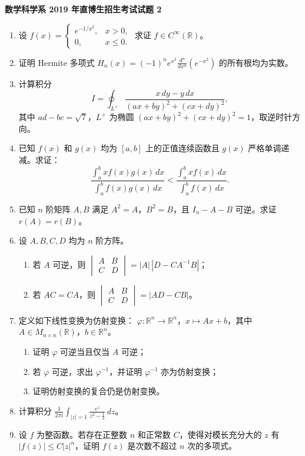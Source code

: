 \documentclass[UTF8,11pt,fontset=none]{ctexart}
\newcommand{\paperheading}[1]{\begin{center}\Large\bfseries #1\end{center}\vspace{.45em}}
\newcommand{\newpaper}[1]{\clearpage\paperheading{#1}}
\begin{document}
\newpaper{数学科学系 2019 年直博生招生考试试题 2}
\begin{enumerate}
\item 设
$\displaystyle f(x)=\begin{cases}e^{-1/x^2},&x>0,\\0,&x\le0.\end{cases}$
求证 $f\in C^{\infty}(\mathbb R)$。
\item 证明 Hermite 多项式
$\displaystyle H_n(x)=(-1)^n e^{x^2}\frac{d^n}{dx^n}(e^{-x^2})$
的所有根均为实数。
\item 计算积分
\[
I=\oint_{L^+}\frac{x\,dy-y\,dx}{(ax+by)^2+(cx+dy)^2},
\]
其中 $ad-bc=\sqrt7$，$L^+$ 为椭圆 $(ax+by)^2+(cx+dy)^2=1$，取逆时针方向。
\item 已知 $f(x)$ 和 $g(x)$ 均为 $[a,b]$ 上的正值连续函数且 $g(x)$ 严格单调递减。求证：
\[
\frac{\int_a^b x f(x)g(x)\,dx}{\int_a^b f(x)g(x)\,dx}
<
\frac{\int_a^b x f(x)\,dx}{\int_a^b f(x)\,dx}.
\]
\item 已知 $n$ 阶矩阵 $A,B$ 满足 $A^2=A$，$B^2=B$，且 $I_n-A-B$ 可逆。求证 $r(A)=r(B)$。
\item 设 $A,B,C,D$ 均为 $n$ 阶方阵。
\begin{enumerate}
\item 若 $A$ 可逆，则
$\displaystyle\begin{vmatrix}A&B\\C&D\end{vmatrix}=|A|\,|D-CA^{-1}B|$；
\item 若 $AC=CA$，则
$\displaystyle\begin{vmatrix}A&B\\C&D\end{vmatrix}=|AD-CB|$。
\end{enumerate}
\item 定义如下线性变换为仿射变换：
$\varphi:\mathbb R^n\to\mathbb R^n$，$x\mapsto Ax+b$，其中 $A\in M_{n\times n}(\mathbb R)$，$b\in\mathbb R^n$。
\begin{enumerate}
\item 证明 $\varphi$ 可逆当且仅当 $A$ 可逆；
\item 若 $\varphi$ 可逆，求出 $\varphi^{-1}$，并证明 $\varphi^{-1}$ 亦为仿射变换；
\item 证明仿射变换的复合仍是仿射变换。
\end{enumerate}
\item 计算积分
$\displaystyle\frac1{2\pi i}\int_{|z|=1}\frac{e^z}{z^2-\frac14}\,dz$。
\item 设 $f$ 为整函数。若存在正整数 $n$ 和正常数 $C$，使得对模长充分大的 $z$ 有 $|f(z)|\le C|z|^n$，证明 $f(z)$ 是次数不超过 $n$ 次的多项式。
\end{enumerate}
\end{document}
